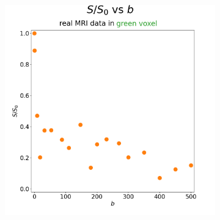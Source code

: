 \begin{figure}
\begin{centering}
\begin{subfigure}{0.45\textwidth}
\begin{centering}
                        \caption{}
                        \label{fig:mri-placenta-comparison-2:real-blue-s-vs-b}
                    \end{centering}
                \end{subfigure}
                \begin{subfigure}{0.45\textwidth}
                    \begin{centering}
                        \includegraphics[width=\textwidth]{diagrams/results-mri/simulated-placenta/mri-spins_s-vs-b_real_mri_1_192,139.png}
                        \caption{}
                        \label{fig:mri-placenta-comparison-2:real-green-s-vs-b}
                    \end{centering}
                \end{subfigure}
                \begin{subfigure}{0.45\textwidth}
                    \begin{centering}

\end{centering}
\end{subfigure}
\end{centering}
\end{figure}
